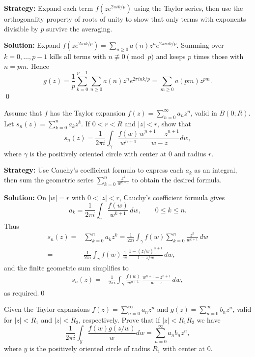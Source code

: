 \noindent\textbf{Strategy:} Expand each term \( f(ze^{2\pi ik/p}) \) using the Taylor series, then use the orthogonality property of roots of unity to show that only terms with exponents divisible by \( p \) survive the averaging.

\bigskip\noindent\textbf{Solution:}
Expand $f(ze^{2\pi ik/p})=\sum_{n\ge0} a(n) z^n e^{2\pi i n k/p}$. Summing over $k=0,\dots,p-1$ kills all terms with $n\not\equiv0\pmod p$ and keeps $p$ times those with $n=pm$. Hence
\[g(z)=\frac1p\sum_{k=0}^{p-1}\sum_{n\ge0} a(n)z^n e^{2\pi i nk/p}=\sum_{m\ge0}a(pm) z^{pm}.\]\qed


\begin{problembox}
Assume that \( f \) has the Taylor expansion \( f(z) = \sum_{n=0}^{\infty} a_n z^n \), valid in \( B(0; R) \). Let \( s_n(z) = \sum_{k=0}^{n} a_k z^k \). If \( 0 < r < R \) and \( |z| < r \), show that
\[ s_n(z) = \frac{1}{2\pi i} \int_\gamma \frac{f(w)}{w^{n+1}} \frac{w^{n+1} -z^{n+1}}{w - z} dw, \]
where \( \gamma \) is the positively oriented circle with center at 0 and radius \( r \).
\end{problembox}

\noindent\textbf{Strategy:} Use Cauchy's coefficient formula to express each \( a_k \) as an integral, then sum the geometric series \( \sum_{k=0}^n \frac{z^k}{w^{k+1}} \) to obtain the desired formula.

\bigskip\noindent\textbf{Solution:}
On $|w|=r$ with $0<|z|<r$, Cauchy's coefficient formula gives
\[a_k=\frac{1}{2\pi i}\int_\gamma \frac{f(w)}{w^{k+1}}\,dw,\qquad 0\le k\le n.\]
Thus
\begin{align*}
s_n(z)=&\sum_{k=0}^n a_k z^k=\frac{1}{2\pi i}\int_\gamma f(w)\sum_{k=0}^n \frac{z^k}{w^{k+1}}\,dw \\
=&\frac{1}{2\pi i}\int_\gamma f(w)\,\frac{1}{w}\,\frac{1-(z/w)^{\,n+1}}{1-z/w}\,dw,
\end{align*}
and the finite geometric sum simplifies to
\begin{align*}
s_n(z)=&\frac{1}{2\pi i}\int_\gamma \frac{f(w)}{w^{n+1}}\,\frac{w^{n+1}-z^{n+1}}{w-z}\,dw,
\end{align*}
as required.\qed


\begin{problembox}
Given the Taylor expansions \( f(z) = \sum_{n=0}^{\infty} a_n z^n \) and \( g(z) = \sum_{n=0}^{\infty} b_n z^n \), valid for \( |z| < R_1 \) and \( |z| < R_2 \), respectively. Prove that if \( |z| < R_1 R_2 \) we have
\[ \frac{1}{2\pi i} \int_y \frac{f(w) g(z/w)}{w} dw = \sum_{n=0}^{\infty} a_n b_n z^n, \]
where \( y \) is the positively oriented circle of radius \( R_1 \) with center at 0.
\end{problembox}

